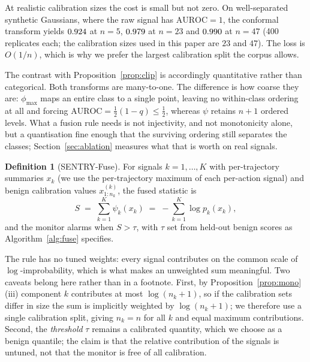 \documentclass[preprint,12pt,number]{elsarticle}
\theoremstyle{definition}
\newtheorem{definition}{Definition}
\begin{document}
At realistic calibration sizes the cost is small but not zero. On well-separated
synthetic Gaussians, where the raw signal has $\mathrm{AUROC} = 1$, the conformal
transform yields $0.924$ at $n=5$, $0.979$ at $n=23$ and
$0.990$ at $n=47$ (400 replicates each; the calibration sizes used in this paper
are $23$ and $47$). The loss is $O(1/n)$, which is why we prefer the largest
calibration split the corpus allows.

The contrast with Proposition~\ref{prop:clip} is accordingly quantitative rather
than categorical. Both transforms are many-to-one. The difference is how coarse
they are: $\phi_{\max}$ maps an entire class to a single point, leaving no
within-class ordering at all and forcing
$\mathrm{AUROC} = \tfrac{1}{2}(1-q) \le \tfrac{1}{2}$, whereas $\psi$ retains
$n+1$ ordered levels. What a fusion rule needs is not injectivity, and not
monotonicity alone, but a quantisation fine enough that the surviving ordering
still separates the classes; Section~\ref{sec:ablation} measures what that is
worth on real signals.

\begin{definition}[SENTRY-Fuse]
For signals $k = 1,\dots,K$ with per-trajectory summaries $x_k$ (we use the
per-trajectory maximum of each per-action signal) and benign calibration values
$x^{(k)}_{1:n_k}$, the fused statistic is
\begin{equation}\label{eq:fuse}
S \;=\; \sum_{k=1}^{K} \psi_k(x_k) \;=\; -\sum_{k=1}^{K} \log p_k(x_k),
\end{equation}
and the monitor alarms when $S > \tau$, with $\tau$ set from held-out benign scores
as Algorithm~\ref{alg:fuse} specifies.
\end{definition}

The rule has no tuned weights: every signal contributes on the common scale of
$\log$-improbability, which is what makes an unweighted sum meaningful. Two
caveats belong here rather than in a footnote. First, by
Proposition~\ref{prop:mono}(iii) component $k$ contributes at most
$\log(n_k{+}1)$, so if the calibration sets differ in size the sum is implicitly
weighted by $\log(n_k{+}1)$; we therefore use a single calibration split, giving
$n_k = n$ for all $k$ and equal maximum contributions. Second, the
\emph{threshold} $\tau$ remains a calibrated quantity, which we choose as a
benign quantile; the claim is that the relative contribution of the signals is
untuned, not that the monitor is free of all calibration.
\end{document}
